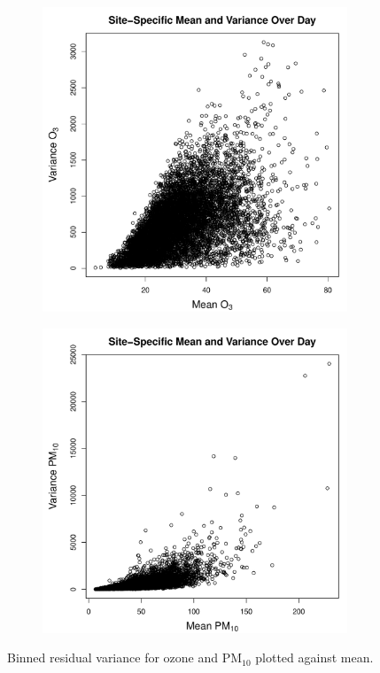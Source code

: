 \documentclass[alpha-refs]{wiley-article}
\begin{document}
\begin{figure}[H]
  \begin{center}
   \begin{subfigure}[b]{.45\textwidth}
      \includegraphics[width=.9\textwidth]{ozone_mean_var}
   \end{subfigure}
   \hspace{10mm}
     \begin{subfigure}[b]{.45\textwidth}
     \includegraphics[width=.9\textwidth]{pm10_mean_var}
   \end{subfigure}
  \end{center}
  \vspace{-4mm}
       \caption{Binned residual variance for ozone and $\text{PM}_{10}$ plotted against mean.}\label{fig:mean_var}
\end{figure}
\end{document}
